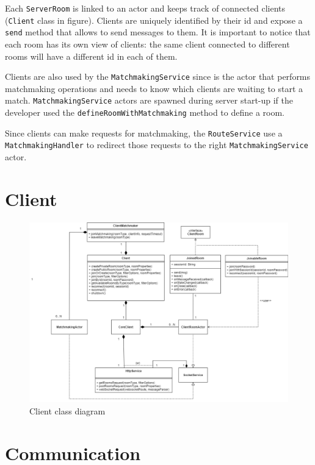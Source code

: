 Each \texttt{ServerRoom} is linked to an actor and keeps track of connected clients (\texttt{Client} class in figure). Clients are uniquely identified by their id and expose a \texttt{send} method that allows to send messages to them. It is important to notice that each room has its own view of clients: the same client connected to different rooms will have a different id in each of them. 

Clients are also used by the \texttt{MatchmakingService} since is the actor that performs matchmaking operations and needs to know which clients are waiting to start a match. \texttt{MatchmakingService} actors are spawned during server start-up if the developer used the \texttt{defineRoomWithMatchmaking} method to define a room. 

Since clients can make requests for matchmaking, the \texttt{RouteService} use a \texttt{MatchmakingHandler} to redirect those requests to the right \texttt{MatchmakingService} actor.


\section{Client}

\begin{figure}[H]
	\hspace*{-1.7in}
	\includegraphics[scale=0.55]{images/4-design/client_class.png}
	\caption{Client class diagram}
	\label{fig:client_class_diagram}
\end{figure}

\section{Communication}\label{sec:communication_design}


